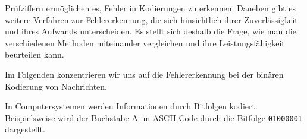 





Prüfziffern ermöglichen es, Fehler in Kodierungen zu erkennen.
Daneben gibt es weitere Verfahren zur Fehlererkennung, die sich
hinsichtlich ihrer Zuverlässigkeit und ihres Aufwands unterscheiden.
Es stellt sich deshalb die Frage, wie man die verschiedenen
Methoden miteinander vergleichen und ihre Leistungsfähigkeit
beurteilen kann.

Im Folgenden konzentrieren wir uns auf die Fehlererkennung
bei der binären Kodierung von Nachrichten.

In Computersystemen werden Informationen durch Bitfolgen kodiert.
Beispielsweise wird der Buchstabe A im ASCII-Code durch die
Bitfolge \texttt{01000001} dargestellt.

